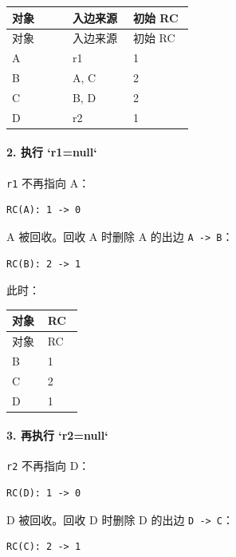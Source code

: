\documentclass[UTF8]{ctexart}
\begin{document}
\begin{longtable}{|p{0.31\linewidth}|p{0.31\linewidth}|p{0.31\linewidth}|}
\hline
对象 & 入边来源 & 初始 RC \\
\hline
\endfirsthead
对象 & 入边来源 & 初始 RC \\
\hline
\endhead
A & r1 & 1 \\
\hline
B & A, C & 2 \\
\hline
C & B, D & 2 \\
\hline
D & r2 & 1 \\
\hline
\end{longtable}

\paragraph*{2. 执行 `r1=null`}

\texttt{r1} 不再指向 A：

\begin{Verbatim}[fontsize=\small,breaklines=true]
RC(A): 1 -> 0
\end{Verbatim}

A 被回收。回收 A 时删除 A 的出边 \texttt{A -> B}：

\begin{Verbatim}[fontsize=\small,breaklines=true]
RC(B): 2 -> 1
\end{Verbatim}

此时：

\begin{longtable}{|p{0.47\linewidth}|p{0.47\linewidth}|}
\hline
对象 & RC \\
\hline
\endfirsthead
对象 & RC \\
\hline
\endhead
B & 1 \\
\hline
C & 2 \\
\hline
D & 1 \\
\hline
\end{longtable}

\paragraph*{3. 再执行 `r2=null`}

\texttt{r2} 不再指向 D：

\begin{Verbatim}[fontsize=\small,breaklines=true]
RC(D): 1 -> 0
\end{Verbatim}

D 被回收。回收 D 时删除 D 的出边 \texttt{D -> C}：

\begin{Verbatim}[fontsize=\small,breaklines=true]
RC(C): 2 -> 1
\end{Verbatim}
\end{document}
